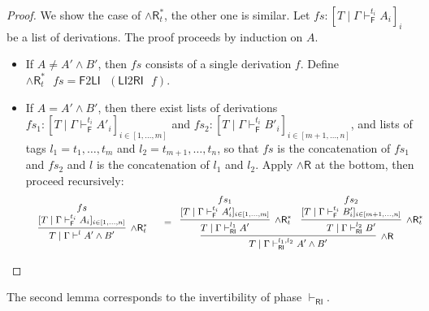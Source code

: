 \documentclass[submission,copyright,creativecommons]{eptcs}
\theoremstyle{definition}
\newcommand{\andr}{\land \mathsf{R}}
\newcommand{\RI}{\mathsf{RI}}
\newcommand{\LI}{\mathsf{LI}}
\newcommand{\F}{\mathsf{F}}
\newcommand{\proofbox}[1]{\begin{tabular}{l} #1 \end{tabular}}
\begin{document}
\begin{proof}
  We show the case of $\andr^{*}_{t}$, the other one is similar.
  Let $fs : [T \mid \Gamma \vdash^{t_i}_{\F} A_i]_i$ be a list of derivations. The proof proceeds by induction on $A$.
  \begin{itemize}
    \item If $A \neq A' \land B'$, then $fs$ consists of a single derivation $f$. Define $\andr^*_{t} \text{ } fs = \F 2 \LI \text{ } (\LI 2 \RI \text{ } f)$.
    \item If $A = A' \land B'$, then there exist lists of derivations $fs_1 : [T \mid \Gamma \vdash^{t_i}_{\F} A'_i]_{i \in [1 , \dots , m]}$ and $fs_2 : [T \mid \Gamma \vdash^{t_i}_{\F} B'_i]_{i \in [m+1 , \dots , n]}$, and lists of tags $l_1 = t_1 , \dots , t_m$ and $l_2 = t_{m+1} , \dots , t_n$, so that $fs$ is the concatenation of $fs_1$ and $fs_2$ and $l$ is the concatenation of $l_1 $ and $l_2$.
    Apply $\andr$ at the bottom, then proceed recursively:
    \begin{displaymath}
      \small
      \begin{array}{cc}
        \proofbox{
        \infer[\andr^*_{t}]{T \mid \Gamma \vdash^{l} A' \land B'}{
          \deduce{[T \mid \Gamma \vdash^{t_i}_{\F} A_i]_{i \in [1 , \dots , n]}}{fs}
        }
        }
        &
        =
        \proofbox{
        \infer[\andr]{T \mid \Gamma \vdash^{l_1 , l_2}_{\RI} A' \land B'}{
          \infer[\andr^{*}_{t}]{T \mid \Gamma \vdash^{l_1}_{\RI} A'}{
            \deduce{[T \mid \Gamma \vdash^{t_i}_{\F} A'_i]_{i \in [1 , \dots , m]}}{fs_1}
          }
          &
          \infer[\andr^{*}_{t}]{T \mid \Gamma \vdash^{l_2}_{\RI} B'}{
            \deduce{[T \mid \Gamma \vdash^{t_i}_{\F} B'_i]_{i \in [m+1 , \dots , n]}}{fs_2}
          }
        }
       }
      \end{array}
    \end{displaymath}
  \end{itemize}
\end{proof}

The second lemma corresponds to the invertibility of phase $\vdash_\RI$.
\end{document}
